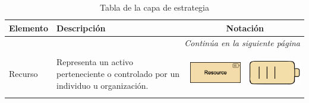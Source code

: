 \begin{longtable}{|p{0.15\linewidth}|p{0.45\linewidth}|p{0.2\linewidth} p{0.2\linewidth}|}
    \caption{Tabla de la capa de estrategia}
    \\
    \hline
    \rowcolor[HTML]{AFC5F6} 
    \textbf{Elemento} & \textbf{Descripción} & \multicolumn{2}{c|}{\textbf{Notación}} \\
    \hline
    \endhead
    \hline
    \multicolumn{4}{r}{\textit{Continúa en la siguiente página}} \\
    \endfoot
    \hline
    \endlastfoot
    \label{tab:Tabla de la capa de estrategia}



    Recurso 
    &
    Representa un activo perteneciente o controlado por un individuo u organización. 
    &
\begin{center}
    \includegraphics[width=1\linewidth]{imgs/capa_estrategia/fig-Resource-Notation_1.pdf}
\end{center} 
&
\begin{center}
    \includegraphics[width=0.8\linewidth]{imgs/capa_estrategia/fig-Resource-Notation_2.pdf}
\end{center}
    \\ \hline




\end{longtable}
